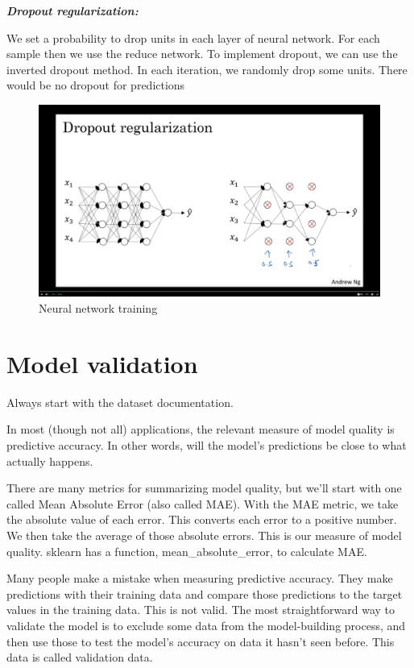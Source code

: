 \documentclass[12pt]{report}
\begin{document}
\textbf{\textit{Dropout regularization:}}

We set a probability to drop units in each layer of neural network. For each sample then we use the reduce network. To implement dropout, we can use the inverted dropout method. In each iteration, we randomly drop some units. There would be no dropout for predictions

\begin{figure}[H]
  \centering
  \includegraphics[trim =3.0cm 2.0cm 3.0cm 2.0cm, clip, scale=0.12]{pics/dropoutregularization.png}
  \caption{Neural network training}
\end{figure}




\section{Model validation}

Always start with the dataset documentation.

In most (though not all) applications, the relevant measure of model quality is predictive accuracy. In other words, will the model's predictions be close to what actually happens.

There are many metrics for summarizing model quality, but we'll start with one called Mean Absolute Error (also called MAE). With the MAE metric, we take the absolute value of each error. This converts each error to a positive number. We then take the average of those absolute errors. This is our measure of model quality. sklearn has a function, mean\_absolute\_error, to calculate MAE.


Many people make a mistake when measuring predictive accuracy. They make predictions with their training data and compare those predictions to the target values in the training data. This is not valid. The most straightforward way to validate the model is to exclude some data from the model-building process, and then use those to test the model's accuracy on data it hasn't seen before. This data is called validation data.
\end{document}
